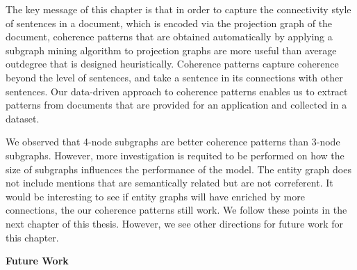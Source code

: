 The key message of this chapter is that in order to capture the connectivity style of sentences in  a document, which is encoded via the projection graph of the document, coherence patterns that are obtained automatically by applying a subgraph mining algorithm to projection graphs are more useful than average outdegree that is designed heuristically. 
Coherence patterns capture coherence beyond the level of sentences, and take a sentence in its connections with other sentences. 
Our \mbox{data-driven} approach to coherence patterns enables us to extract patterns from documents that are provided for an application and collected in a dataset. 

We observed that 4-node subgraphs are better coherence patterns than 3-node subgraphs. 
However, more investigation is requited to be performed on how the size of subgraphs influences the performance of the model. 
The entity graph does not include mentions that are semantically related but are not correferent. 
It would be interesting to see if entity graphs will have enriched by more  connections, the our coherence patterns still work. 
We follow these points in the next chapter of this thesis.  
However, we see other directions for future work for this chapter. 

\textbf{Future Work}













